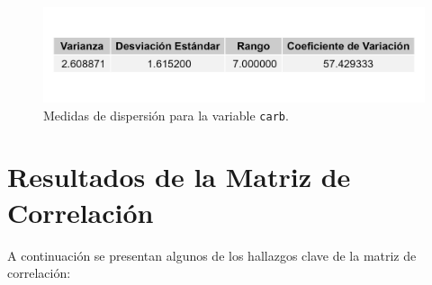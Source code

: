 \documentclass{article}
\begin{document}
\begin{enumerate}
          \begin{figure}[H]
              \centering
              \includegraphics[width=\textwidth]{MTC/carb_dispersion.png}
              \caption{Medidas de dispersión para la variable \texttt{carb}.}
              \label{fig:carb_dispersion}
          \end{figure}

\end{enumerate}

\section{Resultados de la Matriz de Correlación}
A continuación se presentan algunos de los hallazgos clave de la matriz de correlación:
\end{document}
